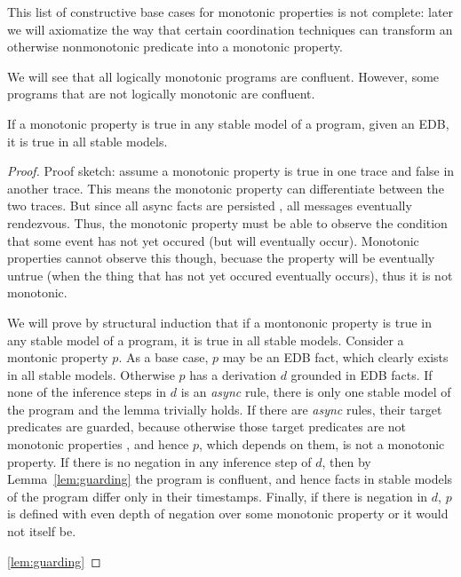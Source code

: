 This list of constructive base cases for monotonic properties is not complete: later we will
axiomatize the way that certain coordination techniques can transform an otherwise 
nonmonotonic predicate into a monotonic property.


We will see that all logically monotonic programs are confluent.  However, some programs that are not logically monotonic are confluent.

\begin{lemma}
If a monotonic property is true in any stable model of a program, given an EDB, it is true in all stable models. 
\end{lemma}
\begin{proof}
Proof sketch: assume a monotonic property is true in one trace and false in another trace.  This means the monotonic property can differentiate between the two traces.  But since all async facts are persisted , all messages eventually rendezvous.  Thus, the monotonic property must be able to observe the condition that some event has not yet occured (but will eventually occur).   Monotonic properties cannot observe this though, becuase the property will be eventually untrue (when the thing that has not yet occured eventually occurs), thus it is not monotonic. 

We will prove by structural induction that if a montononic property is true in any stable
model of a \lang program, it is true in all stable models.  Consider a montonic property
$p$.  As a base case, $p$ may be an EDB fact, which clearly exists in all stable models.
Otherwise $p$ has a derivation $d$ grounded in EDB facts.  If none of the inference 
steps in $d$ is an {\em async} rule, there is only one stable model of the program  and
the lemma trivially holds.  If there are {\em async} rules, their target predicates are guarded,
because otherwise those target predicates are not monotonic
properties , and hence $p$, which depends on them, is not a monotonic property.  If there 
is no negation in any inference step of $d$, then by Lemma~\ref{lem:guarding} the program
is confluent, and hence facts in stable models of the program differ only in their timestamps.
Finally, if there is negation in $d$, $p$ is defined with even depth of negation over some
monotonic property or it would not itself be.    

\ref{lem:guarding}
\end{proof}

